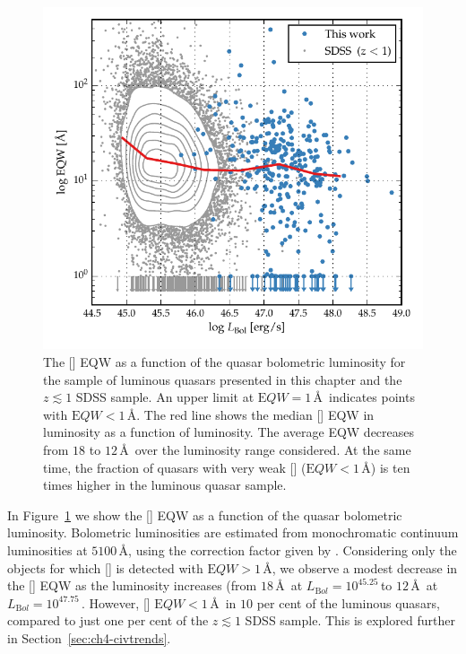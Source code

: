 \begin{figure}[t!]
\centering 
    \includegraphics[width=\columnwidth]{figures/chapter04/eqw_lum.pdf} 
    \caption[{The [] EQW as a function of the quasar bolometric luminosity for the sample presented in this chapter (blue circles) and the low-$z$ SDSS sample (grey points and contours).}]{The [] EQW as a function of the quasar bolometric luminosity for the sample of luminous quasars presented in this chapter and the $z\lesssim1$ SDSS sample. An upper limit at ${\mathrm EQW}=1$\,\AA\, indicates points with ${\mathrm EQW} < 1$\,\AA. The red line shows the median [] EQW in luminosity as a function of luminosity. The average EQW decreases from $18$ to $12$\,\AA\, over the luminosity range considered. At the same time, the fraction of quasars with very weak [] (${\mathrm EQW} < 1$\,\AA) is ten times higher in the luminous quasar sample.}     
    \label{fig:eqw_lum}
\end{figure}

In Figure~\ref{fig:eqw_lum} we show the [] EQW as a function of the quasar bolometric luminosity. 
Bolometric luminosities are estimated from monochromatic continuum luminosities at $5100$\,\AA, using the correction factor given by \citet{richards06}. 
Considering only the objects for which [] is detected with ${\mathrm EQW} > 1$\,\AA, we observe a modest decrease in the [] EQW as the luminosity increases (from $18$\,\AA\, at $L_{\mathrm Bol}=10^{45.25}$\,\ergs to $12$\,\AA\, at $L_{\mathrm Bol}=10^{47.75}$\,\ergs. 
However, [] ${\mathrm EQW} < 1$\,\AA\, in $10$ per cent of the luminous quasars, compared to just one per cent of the $z \lesssim 1$ SDSS sample.
This is explored further in Section~\ref{sec:ch4-civtrends}.  

